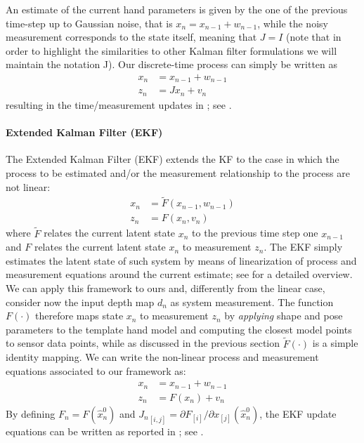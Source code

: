 % 
An estimate of the current hand parameters is given by the one of the previous time-step up to Gaussian noise, that is $x_n = x_{n-1} + w_{n-1}$, while the noisy measurement corresponds to the state itself, meaning that $J = I$ (note that in order to highlight the similarities to other Kalman filter formulations we will maintain the notation J). Our discrete-time process can simply be written as
% 
\begin{align}
x_n &= x_{n - 1} + w_{n - 1} \\
z_n &= J x_n + v_n
\end{align}
% 
resulting in the time/measurement updates in ; see \cite{welch1995introduction}.

\paragraph{Extended Kalman Filter (EKF)}
The Extended Kalman Filter (EKF) extends the KF to the case in which the process to be estimated and/or the measurement relationship to the process are not linear:
% 
\begin{align}
x_n &= \tilde{F}(x_{n - 1},  w_{n - 1}) \\
z_n &= F(x_n, v_n)
\end{align}
% 
where $\tilde{F}$ relates the current latent state $ x _n$ to the previous time step one $ x _{n-1}$ and $F$ relates the current latent state $ x _n$ to measurement $ z _n$.
The EKF simply estimates the latent state of such system by means of linearization of process and measurement equations around the current estimate; see \cite{welch1995introduction} for a detailed overview.
We can apply this framework to ours and, differently from the linear case, consider now the input depth map $d_n$ as system measurement. The function $F(\cdot)$ therefore maps state $x_n$ to measurement $z_n$ by \emph{applying} shape and pose parameters to the template hand model and computing the closest model points to sensor data points, while as discussed in the previous section $\tilde{F}(\cdot)$ is a simple identity mapping.
We can write the non-linear process and measurement equations associated to our framework as:
% 
\begin{align}
	x_n &= x_{n - 1} + w_{n - 1} \\
	z_n &= F(x_n) + v_n 
\end{align}
%
By defining $F_n = F(\hat{x}_n^0)$ and ${J_n}_{[i, j]} = \partial F_{[i]} / \partial x_{[j]}(\hat{x}_n^0)$, the EKF update equations can be written as reported in ; see \cite{welch1995introduction}.
%


